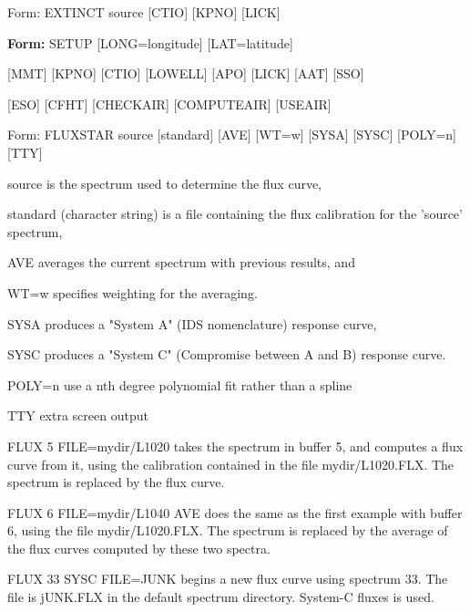 {\newpage\clearpage
{}%
\begin{command}
  \item[Form: EXTINCT source {[CTIO]} {[KPNO]} {[LICK]}\hfill]{}
\end{command}%
\lthtmlfigureZ
\lthtmlcheckvsize\clearpage}

{\newpage\clearpage
{}%
\begin{command}
  \item[\textbf{Form: } SETUP {[LONG=longitude]} {[LAT=latitude]}\hfill]{}
  \item{{[MMT]} {[KPNO]} {[CTIO]} {[LOWELL]} {[APO]} {[LICK]} {[AAT]} {[SSO]}}
  \item{{[ESO]} {[CFHT]} {[CHECKAIR]} {[COMPUTEAIR]} {[USEAIR]}} 
\end{command}%
\lthtmlfigureZ
\lthtmlcheckvsize\clearpage}

{\newpage\clearpage
{}%
\begin{command}
  \item[Form: FLUXSTAR source {[standard]} {[AVE]} {[WT=w]} {[SYSA]} {[SYSC]}
       {[POLY=n]} {[TTY]}\hfill]{}
  \item[source]{is the spectrum used to determine the flux curve,}
  \item[standard]{(character string) is a file 
       containing the flux calibration for the 'source' spectrum,}
  \item[AVE]{averages the current spectrum with previous results, and}
  \item[WT=w]{specifies weighting for the averaging.}
  \item[SYSA]{produces a "System A" (IDS nomenclature) response curve,}
  \item[SYSC]{produces a "System C" (Compromise between A and B) response 
       curve.}
  \item[POLY=n]{use a nth degree polynomial fit rather than a spline}
  \item[TTY]{extra screen output}
\end{command}%
\lthtmlfigureZ
\lthtmlcheckvsize\clearpage}

{\newpage\clearpage
{}%
\begin{example}
  \item[FLUX 5 FILE=mydir/L1020\hfill]{takes the spectrum in buffer 5, and
       computes a flux curve from it, using the calibration contained in
       the file mydir/L1020.FLX.  The spectrum is replaced by the flux
       curve.}
\par\item[FLUX 6 FILE=mydir/L1040 AVE\hfill]{does the same as the first
       example with buffer 6, using the file mydir/L1020.FLX.  The spectrum
       is replaced by the average of the flux curves computed by these two
       spectra.}
\par\item[FLUX 33 SYSC FILE=JUNK\hfill]{begins a new flux curve using
       spectrum 33.  The file is jUNK.FLX in the default spectrum
       directory.  System-C fluxes is used.}
\end{example}%
\lthtmlfigureZ
\lthtmlcheckvsize\clearpage}

